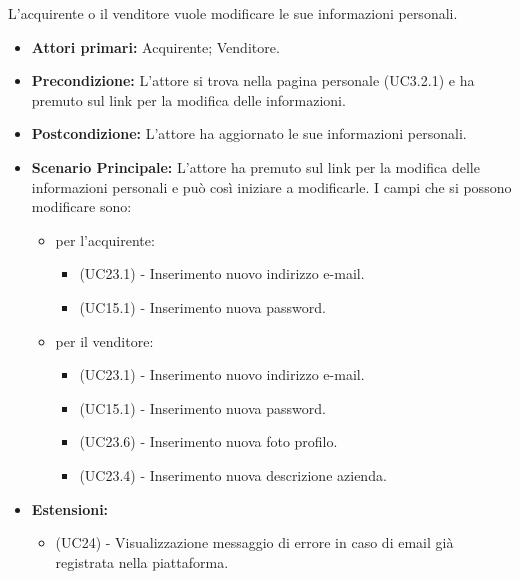 L'acquirente o il venditore vuole modificare le sue informazioni personali.
\begin{itemize}
    \item \textbf{Attori primari:} Acquirente; Venditore.
    \item \textbf{Precondizione:} L'attore si trova nella pagina personale (UC3.2.1) e ha premuto sul link per la modifica delle informazioni.
    \item \textbf{Postcondizione:} L'attore ha aggiornato le sue informazioni personali.
    \item \textbf{Scenario Principale:} L'attore ha premuto sul link per la modifica delle informazioni personali e può così iniziare a modificarle. I campi che si possono modificare sono:
    \begin{itemize}
        \item per l'acquirente:
        \begin{itemize}
            \item (UC23.1) - Inserimento nuovo indirizzo e-mail.
            \item (UC15.1) - Inserimento nuova password.
        \end{itemize}
        \item per il venditore:
        \begin{itemize}
            \item (UC23.1) - Inserimento nuovo indirizzo e-mail.
            \item (UC15.1) - Inserimento nuova password.
            \item (UC23.6) - Inserimento nuova foto profilo.
            \item (UC23.4) - Inserimento nuova descrizione azienda.
        \end{itemize}
    \end{itemize}
    \item \textbf{Estensioni:}
    \begin{itemize}
        \item (UC24) - Visualizzazione messaggio di errore in caso di email già registrata nella piattaforma.
    \end{itemize}
\end{itemize}

\resetSubUC

